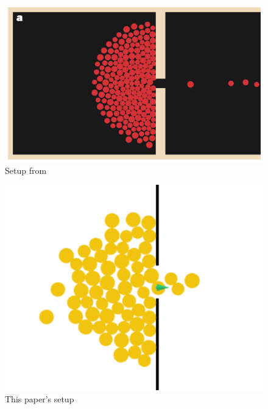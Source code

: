 \documentclass[11pt]{article}
\begin{document}
\begin{minipage}{.4\textwidth}
		\begin{figure}[H]
			\centering
			\includegraphics[width=1\linewidth]{assets/helbling-experiment-1}\\
			Setup from \cite{Helbing}
		\end{figure}
	\end{minipage}
	\begin{minipage}{.2\textwidth}	
	\vfill\hfill
	\end{minipage}
	\begin{minipage}{.4\textwidth}
		\begin{figure}[H]
			\centering
			\includegraphics[width=.75\linewidth]{assets/experiment-1}\\
			This paper's setup
		\end{figure}
	\end{minipage}
	
\end{document}
